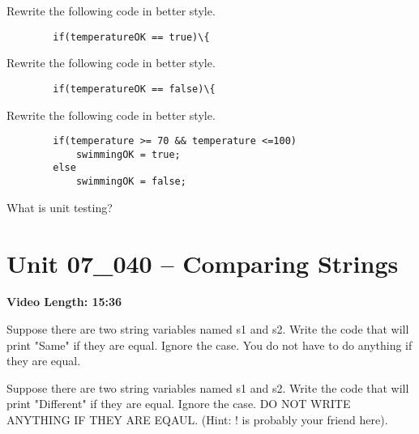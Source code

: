 \documentclass[letterpaper,12pt]{exam}
\newcommand{\unit}{Unit 07}
\begin{document}
\begin{questions}
\begin{samepage}
    \question Rewrite the following code in better style.
    \begin{verbatim}
        if(temperatureOK == true)\{
    \end{verbatim}    
    \vspace{5mm}
\end{samepage}


\begin{samepage}
    \question Rewrite the following code in better style.
    \begin{verbatim}
        if(temperatureOK == false)\{
    \end{verbatim}    
    \vspace{5mm}
\end{samepage}


\begin{samepage}
    \question Rewrite the following code in better style.
    \begin{verbatim}
        if(temperature >= 70 && temperature <=100)
            swimmingOK = true;
        else
            swimmingOK = false;
    \end{verbatim}    
    \vspace{5mm}
\end{samepage}

\begin{samepage}
    \question What is unit testing?
    \vspace{5mm}
\end{samepage}

\section*{\unit\_040 -- Comparing Strings} %
\noindent \textbf{Video Length: 15:36}

\begin{samepage}
    \question Suppose there are two string variables named s1 and s2.  Write the code that will print "Same" if they are equal.  Ignore the case.  You do not have to do anything if they are equal.
    \vspace{15mm}
\end{samepage}

\begin{samepage}
    \question Suppose there are two string variables named s1 and s2.  Write the code that will print "Different" if they are equal.  Ignore the case.  DO NOT WRITE ANYTHING IF THEY ARE EQAUL.  (Hint: ! is probably your friend here).
    \vspace{15mm}
\end{samepage}


\end{questions}
\end{document}
